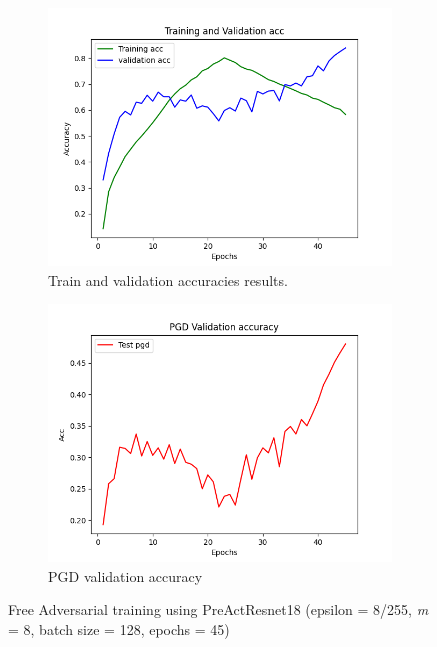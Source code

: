 \documentclass{article}
\begin{document}
\newpage

\begin{figure}[hbt!]
  \centering
  \begin{subfigure}[b]{0.4\linewidth}
    \includegraphics[width=\linewidth]{images/FreePre/free2.png}
    \caption{ Train and validation accuracies results.}
  \end{subfigure}
  \begin{subfigure}[b]{0.4\linewidth}
    \includegraphics[width=\linewidth]{images/FreePre/free5.png}
    \caption{PGD validation accuracy}
  \end{subfigure}
  \caption{Free Adversarial training using PreActResnet18 (epsilon = 8/255, \textit{m} = 8, batch size = 128,  epochs = 45)}
  \label{fig:coffee}
\end{figure}
\end{document}

